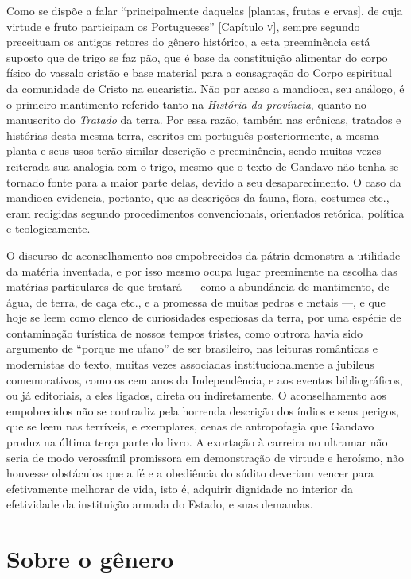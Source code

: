 Como se dispõe a falar ``principalmente daquelas [plantas,
frutas e ervas], de cuja virtude e fruto participam os
Portugueses'' [Capítulo \textsc{v}], sempre segundo preceituam os
antigos retores do gênero histórico, a esta preeminência está suposto
que de trigo se faz pão, que é base da constituição alimentar do corpo
físico do vassalo cristão e base material para a consagração do Corpo
espiritual da comunidade de Cristo na eucaristia. Não por acaso a
mandioca, seu análogo, é o primeiro mantimento referido tanto na
\textit{História da província}, quanto no manuscrito do \textit{Tratado} da terra. Por
essa razão, também nas crônicas, tratados e histórias desta mesma
terra, escritos em português posteriormente, a mesma planta e seus usos
terão similar descrição e preeminência, sendo muitas vezes reiterada
sua analogia com o trigo, mesmo que o texto de Gandavo não tenha se
tornado fonte para a maior parte delas, devido a seu desaparecimento. O
caso da mandioca evidencia, portanto, que as descrições da fauna,
flora, costumes etc., eram redigidas segundo procedimentos
convencionais, orientados retórica, política e teologicamente.

O discurso de aconselhamento aos empobrecidos da pátria demonstra a
utilidade da matéria inventada, e por isso mesmo ocupa lugar
preeminente na escolha das matérias particulares de que tratará --- como
a abundância de mantimento, de água, de terra, de caça etc., e a
promessa de muitas pedras e metais ---, e que hoje se leem como elenco de
curiosidades especiosas da terra, por uma espécie de contaminação
turística de nossos tempos tristes, como outrora havia sido argumento
de ``porque me ufano'' de ser brasileiro, nas leituras românticas e
modernistas do texto, muitas vezes associadas institucionalmente a
jubileus comemorativos, como os cem anos da Independência, e aos
eventos bibliográficos, ou já editoriais, a eles ligados, direta ou
indiretamente. O aconselhamento aos empobrecidos não se contradiz pela
horrenda descrição dos índios e seus perigos, que se leem nas
terríveis, e exemplares, cenas de antropofagia que Gandavo produz na
última terça parte do livro. A exortação à carreira no ultramar não
seria de modo verossímil promissora em demonstração de virtude e heroísmo,
não houvesse obstáculos que a fé e a obediência do súdito deveriam
vencer para efetivamente melhorar de vida, isto é, adquirir dignidade
no interior da efetividade da instituição armada do Estado, e suas
demandas.


\section{Sobre o gênero}

